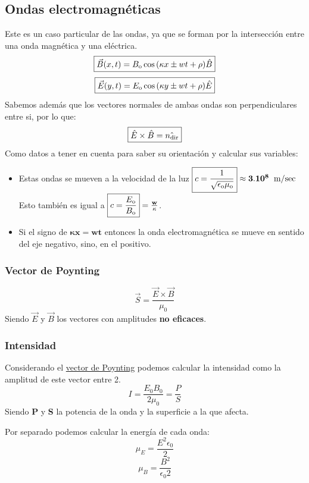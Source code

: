 \subsection{Ondas electromagnéticas}
 Este es un caso particular de las ondas, ya que se forman por la intersección entre una onda magnética y una eléctrica.
\[
        \boxed{\vec{B}(x,t) = B_{\textnormal{o}} \cos{(\kappa x \pm  wt+\rho)} \hat{B}}
\]\[
        \boxed{\vec{E}(y,t) = E_{\textnormal{o}} \cos{(\kappa y \pm  wt+\rho)} \hat{E}}
\]
 Sabemos además que los vectores normales de ambas ondas son perpendiculares entre si, por lo que:
\[
        \mathbf{\boxed{\hat{E} \times \hat{B} = \hat{n_{\textnormal{dir}}}}}
\]
 Como datos a tener en cuenta para saber su orientación y calcular sus variables:
\begin{itemize}
        \item Estas ondas se mueven a la velocidad de la luz \(\mathbf{\boxed{c = \frac{1}{\sqrt{\epsilon_{\textnormal{o}}\mu_{\textnormal{o}}}}}\approx 3.10^8\hspace{2mm}\textnormal{m/sec}}\) Esto también es igual a \(\mathbf{\boxed{c=\frac{E_{\textnormal{o}}}{B_{\textnormal{o}}}} = \frac{w}{\kappa}}\).
        \item Si el signo de \(\boxed{\mathbf{ \kappa x } = \mathbf{wt}}\) entonces la onda electromagnética se mueve en sentido del eje negativo, sino, en el positivo.
\end{itemize}
\subsubsection{Vector de Poynting}
\[
        \boxed{\vec{S} = \frac{\vec{E}\times \vec{B}}{\mu_0}}
\]
 Siendo \(\vec{E}\) y \(\vec{B}\) los vectores con amplitudes \textbf{no eficaces}.
\subsubsection{Intensidad}
 Considerando el \underline{vector de Poynting} podemos calcular la intensidad como la amplitud de este vector entre 2.
\[
        \boxed{I = \frac{E_0 B_0}{2\mu_0} = \frac{P}{S}}
\]
 Siendo \textbf{P} y \textbf{S} la potencia de la onda y la superficie a la que afecta.
\par  Por separado podemos calcular la energía de cada onda:
\[
        \boxed{\mu_E = \frac{E^2\epsilon_0}{2}}
\]
\[
        \boxed{\mu_B = \frac{B^2}{\epsilon_0 2}}
\]